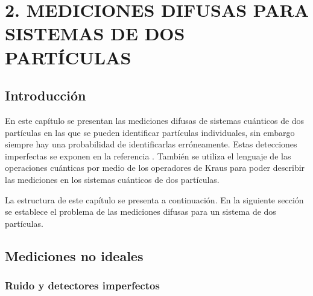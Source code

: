 \chapter[MEDICIONES DIFUSAS PARA SISTEMA DE DOS PARTÍCULAS]{2. MEDICIONES DIFUSAS PARA SISTEMAS DE DOS PARTÍCULAS}

\section{Introducción}
 En este capítulo se presentan las mediciones difusas de sistemas cuánticos de
dos partículas en las que se pueden identificar partículas individuales, sin embargo siempre hay una probabilidad de identificarlas erróneamente. Estas detecciones imperfectas se exponen en la referencia {\cite{Pineda_2021}}. También se utiliza el lenguaje de las operaciones cuánticas por medio de los operadores de Kraus para poder describir las mediciones en los sistemas cuánticos de dos partículas.

La estructura de este capítulo se presenta a continuación. 
En la siguiente sección se establece el problema de las mediciones difusas para un sistema de dos partículas. 


\section{Mediciones no ideales}

\subsection{Ruido y detectores imperfectos}




